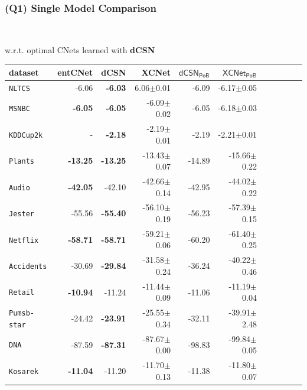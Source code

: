 \documentclass[xcolor={usenames,dvipsnames,svgnames}, compress]{beamer}
\newcommand{\highlighttext}[2][yellow]{{\colorbox{#1}{\strut\textcolor{white}{#2}}}}
\begin{document}
\begin{frame}[t]
  \frametitle{(Q1) Single Model Comparison}
  \scriptsize
  \highlighttext[gold2]{Comparable log-likelihoods} w.r.t. optimal CNets learned with \textbf{dCSN}
      \begin{table}[t]
  \tiny
  \centering
  \setlength{\tabcolsep}{3pt}  
  \begin{tabular}{l rrrrrrrrrr}
    dataset & \tiny\textsf{entCNet} & \tiny\textsf{dCSN} & \tiny\textsf{XCNet} & \tiny$\mathsf{dCSN_{PoB}}$ & \tiny$\mathsf{XCNet_{PoB}}$\\
    \midrule
    \texttt{NLTCS}        &-6.06 &\cellcolor{gold2}\color{white}\textbf{-6.03}&\color{white}\cellcolor{gold2}6.06$\pm$0.01&-6.09&-6.17$\pm$0.05\\
    \texttt{MSNBC}        &\textbf{-6.05}&\cellcolor{gold2}\color{white}\textbf{-6.05}&\cellcolor{gold2}\color{white}-6.09$\pm$0.02&-6.05&-6.18$\pm$0.03\\
    \texttt{KDDCup2k}     & - &\cellcolor{gold2}\color{white}\textbf{-2.18}&\cellcolor{gold2}\color{white}-2.19$\pm$0.01&-2.19&-2.21$\pm$0.01\\
    \texttt{Plants}       &\textbf{-13.25}&\cellcolor{gold2}\color{white}\textbf{-13.25}&\cellcolor{gold2}\color{white}-13.43$\pm$0.07&-14.89&-15.66$\pm$0.22\\
    \texttt{Audio}        &\textbf{-42.05}&\cellcolor{gold2}\color{white}-42.10&\cellcolor{gold2}\color{white}-42.66$\pm$0.14&-42.95&-44.02$\pm$0.22\\
    \texttt{Jester}       &-55.56&\textbf{-55.40}&-56.10$\pm$0.19&-56.23&-57.39$\pm$0.15\\
    \texttt{Netflix}      &\textbf{-58.71}&\textbf{-58.71}&-59.21$\pm$0.06&-60.20&-61.40$\pm$0.25\\
    \texttt{Accidents}    &-30.69&\textbf{-29.84}& -31.58$\pm$0.24 &-36.24&-40.22$\pm$0.46\\
    \texttt{Retail}       &\textbf{-10.94}&\cellcolor{gold2}\color{white}-11.24&\cellcolor{gold2}\color{white}-11.44$\pm$0.09&-11.06&-11.19$\pm$0.04\\
    \texttt{Pumsb-star}   &-24.42&\textbf{-23.91}&-25.55$\pm$0.34&-32.11&-39.91$\pm$2.48\\
    \texttt{DNA}          &-87.59&\cellcolor{gold2}\color{white}\textbf{-87.31}&\cellcolor{gold2}\color{white}-87.67$\pm$0.00&-98.83&-99.84$\pm$0.05\\
    \texttt{Kosarek}      &\textbf{-11.04}&\cellcolor{gold2}\color{white}-11.20&\cellcolor{gold2}\color{white}-11.70$\pm$0.13&-11.38&-11.80$\pm$0.07\\

\end{tabular}
\end{table}
\end{frame}
\end{document}

